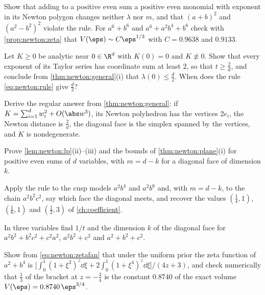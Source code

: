 \begin{refsection}
\begin{exercises}
\item \consolidation Show that adding to a positive even sum a positive even monomial with exponent in its Newton polygon changes neither $\lambda$ nor $m$, and that $(a+b)^2$ and $(a^2-b^2)^2$ violate the rule. For $a^6+b^6$ and $a^6+a^2b^4+b^6$ check with \cref{prop:newton:zeta} that $V(\eps)\sim C\eps^{1/3}$ with $C=0.9638$ and $0.9133$.\label{ex:newton:inside}
\item \consolidation Let $K\ge0$ be analytic near $0\in\R^d$ with $K(0)=0$ and $K\not\equiv0$. Show that every exponent of its Taylor series has coordinate sum at least $2$, so that $t\ge\frac2d$, and conclude from \cref{thm:newton:general}(i) that $\lambda(0)\le\frac d2$. When does the rule \eqref{eq:newton:rule} give $\frac d2$?
\item \consolidation Derive the regular answer from \cref{thm:newton:general}: if $K=\sum_{i=1}^dw_i^2+O(\abs w^3)$, its Newton polyhedron has the vertices $2e_i$, the Newton distance is $\frac2d$, the diagonal face is the simplex spanned by the vertices, and $K$ is nondegenerate.
\item \consolidation\hard Prove \cref{lem:newton:lp}(ii)--(iii) and the bounds of \cref{thm:newton:plane}(i) for positive even sums of $d$ variables, with $m=d-k$ for a diagonal face of dimension $k$. \label{ex:newton:lp3}
\item \byhand Apply the rule to the cusp models $a^2b^4$ and $a^2b^6$ and, with $m=d-k$, to the chain $a^2b^2c^2$, say which face the diagonal meets, and recover the values $(\frac14,1)$, $(\frac16,1)$ and $(\frac12,3)$ of \cref{ch:coefficient}.
\item \byhand In three variables find $1/t$ and the dimension $k$ of the diagonal face for $a^2b^2+b^2c^2+c^2a^2$, $a^2b^2+c^2$ and $a^2+b^2+c^2$. 
\item \byhand Show from \eqref{eq:newton:zetafan} that under the uniform prior the zeta function of $a^2+b^4$ is $\bigl[\int_0^1(1+\xi^2)^z\dd\xi+2\int_0^1(1+\xi^4)^z\dd\xi\bigr]/(4z+3)$, and check numerically that $\frac13$ of the bracket at $z=-\frac34$ is the constant $0.8740$ of the exact volume $V(\eps)=0.8740\,\eps^{3/4}$.

\end{exercises}
\end{refsection}
